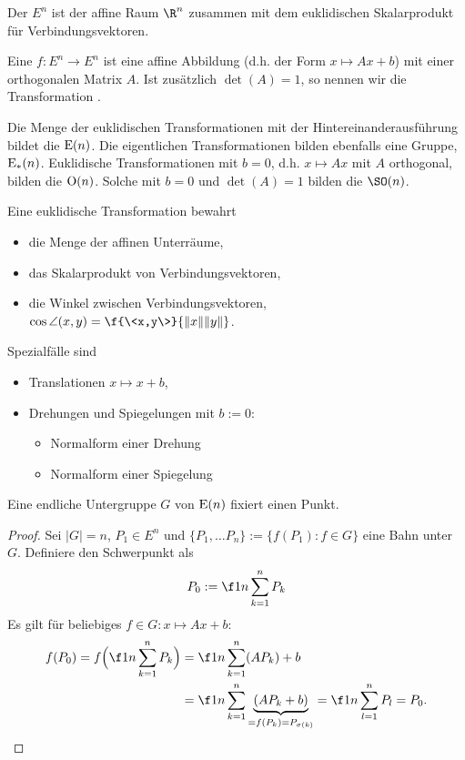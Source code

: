 \begin{df}
	Der  $E^n$ ist der affine Raum $\R^n$ zusammen mit dem euklidischen Skalarprodukt für Verbindungsvektoren.

	Eine  $f: E^n \to E^n$  ist eine affine Abbildung (d.h. der Form $x \mapsto Ax + b$) mit einer orthogonalen Matrix $A$.
	Ist zusätzlich $\det(A) = 1$, so nennen wir die Transformation .

	Die Menge der euklidischen Transformationen mit der Hintereinanderausführung bildet die  $\operatorname{E}(n)$.
	Die eigentlichen Transformationen bilden ebenfalls eine Gruppe, $\operatorname{E}_*(n)$.
	Euklidische Transformationen mit $b = 0$, d.h. $x \mapsto Ax$ mit $A$ orthogonal, bilden die  $\operatorname{O}(n)$.
	Solche mit $b = 0$ und $\det(A) = 1$ bilden die  $\SO(n)$.
\end{df}

\begin{nt}
	Eine euklidische Transformation bewahrt
	\begin{itemize}
		\item
			die Menge der affinen Unterräume,
		\item
			das Skalarprodukt von Verbindungsvektoren,
		\item
			die Winkel zwischen Verbindungsvektoren, $\cos \angle (x,y) = \f {\<x,y\>}{\|x\|\|y\|}$.
	\end{itemize}
	Spezialfälle sind
	\begin{itemize}
		\item
			Translationen $x \mapsto x + b$,
		\item
			Drehungen und Spiegelungen mit $b := 0$:
			\begin{itemize}
				\item
					Normalform einer Drehung
				\item
					Normalform einer Spiegelung
			\end{itemize}
	\end{itemize}
\end{nt}

\begin{lem}
	Eine endliche Untergruppe $G$ von $\operatorname{E}(n)$ fixiert einen Punkt.
	\begin{proof}
		Sei $|G| = n$, $P_1 \in E^n$ und $\{P_1, \dotsc P_n\} := \{f(P_1) : f \in G\}$ eine Bahn unter $G$.
		Definiere den Schwerpunkt als
		\[
			P_0 := \f 1n \sum_{k=1}^n P_k
		\]
		Es gilt für beliebiges $f \in G : x \mapsto Ax + b$:
		\begin{align*}
			f(P_0)
			= f\Big(\f 1n \sum_{k=1}^n P_k\Big)
			&= \f 1n \sum_{k=1}^n (AP_k) + b \\
			&= \f 1n \sum_{k=1}^n \underbrace{(AP_k + b)}_{=f(P_k) = P_{\sigma(k)}}
			= \f 1n \sum_{l=1}^n P_l
			= P_0.
		\end{align*}
	\end{proof}
\end{lem}

